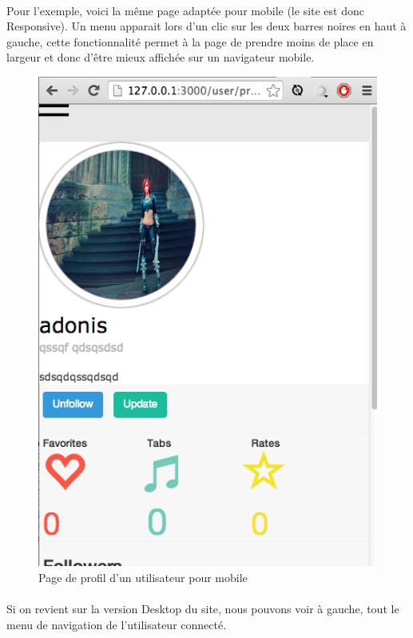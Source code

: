 \paragraph{}
Pour l'exemple, voici la même page adaptée pour mobile (le site est donc Responsive). Un menu apparait lors d'un clic sur les deux barres noires en haut à gauche, cette fonctionnalité permet à la page de prendre moins de place en largeur et donc d'être mieux affichée sur un navigateur mobile.
\begin{figure}[H]
\centering
\includegraphics[scale=0.6]{Responsive1}
\caption{Page de profil d'un utilisateur pour mobile}
\end{figure}
\paragraph{}

\paragraph{}
Si on revient sur la version Desktop du site, nous pouvons voir à gauche, tout le menu de navigation de l'utilisateur connecté.

